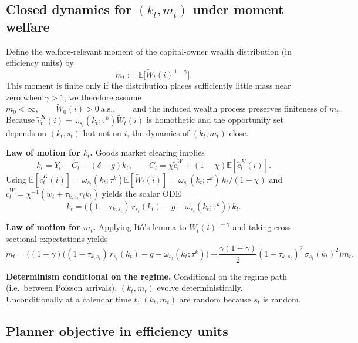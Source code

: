 \documentclass{article}
\begin{document}
\subsection{Closed dynamics for $(k_t,m_t)$ under moment welfare}

Define the welfare-relevant moment of the capital-owner wealth distribution (in efficiency units) by
\[
m_t := \mathbb E\big[\tilde W_t(i)^{\,1-\gamma}\big].
\]
This moment is finite only if the distribution places sufficiently little mass near zero when $\gamma>1$; we therefore assume
\[
m_0<\infty,
\qquad
\tilde W_0(i)>0\ \text{a.s.},
\qquad
\text{and the induced wealth process preserves finiteness of } m_t.
\]
Because $\tilde c^K_t(i)=\omega_{s_t}(k_t;\tau^k)\tilde W_t(i)$ is homothetic and the opportunity set depends on $(k_t,s_t)$ but
not on $i$, the dynamics of $(k_t,m_t)$ close.

\medskip
\noindent
\textbf{Law of motion for $k_t$.}
Goods market clearing implies
\[
\dot k_t = \tilde Y_t-\tilde C_t-(\delta+g)k_t,
\qquad
\tilde C_t = \chi \tilde c^W_t + (1-\chi)\mathbb E[\tilde c^K_t(i)].
\]
Using $\mathbb E[\tilde c^K_t(i)]=\omega_{s_t}(k_t;\tau^k)\mathbb E[\tilde W_t(i)]
=\omega_{s_t}(k_t;\tau^k)\,k_t/(1-\chi)$ and $\tilde c^W_t=\chi^{-1}(\tilde w_t+\tau_{k,s_t}r_t k_t)$ yields the scalar ODE
\[
\dot k_t = \Big((1-\tau_{k,s_t})\,r_{s_t}(k_t)-g-\omega_{s_t}(k_t;\tau^k)\Big)\,k_t.
\]

\medskip
\noindent
\textbf{Law of motion for $m_t$.}
Applying It\^{o}'s lemma to $\tilde W_t(i)^{1-\gamma}$ and taking cross-sectional expectations yields
\[
\dot m_t =
\Bigg(
(1-\gamma)\Big((1-\tau_{k,s_t})\,r_{s_t}(k_t)-g-\omega_{s_t}(k_t;\tau^k)\Big)
-\frac{\gamma(1-\gamma)}{2}(1-\tau_{k,s_t})^2\,\sigma_{s_t}(k_t)^2
\Bigg)m_t.
\]

\medskip
\noindent
\textbf{Determinism conditional on the regime.}
Conditional on the regime path (i.e.\ between Poisson arrivals), $(k_t,m_t)$ evolve deterministically. Unconditionally at a
calendar time $t$, $(k_t,m_t)$ are random because $s_t$ is random.

\subsection{Planner objective in efficiency units}
\end{document}

